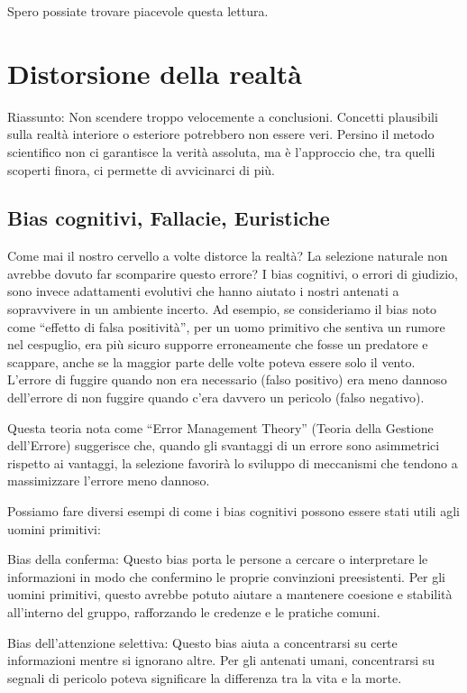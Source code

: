 \documentclass[12pt]{book} %
\begin{document}
Spero possiate trovare piacevole questa lettura.

\clearpage\section{Distorsione della realtà}
\begin{mdframed}[linewidth=1pt]
Riassunto: Non scendere troppo velocemente a conclusioni. Concetti plausibili sulla realtà interiore o esteriore potrebbero non essere veri. Persino il metodo scientifico non ci garantisce la verità assoluta, ma è l'approccio che, tra quelli scoperti finora, ci permette di avvicinarci di più.
\end{mdframed}

\subsection{Bias cognitivi, Fallacie, Euristiche}
Come mai il nostro cervello a volte distorce la realtà? La selezione naturale non avrebbe dovuto far scomparire questo errore?
I bias cognitivi, o errori di giudizio, sono invece adattamenti evolutivi che hanno aiutato i nostri antenati a sopravvivere in un ambiente incerto. Ad esempio, se consideriamo il bias noto come “effetto di falsa positività”, per un uomo primitivo che sentiva un rumore nel cespuglio, era più sicuro supporre erroneamente che fosse un predatore e scappare, anche se la maggior parte delle volte poteva essere solo il vento. L'errore di fuggire quando non era necessario (falso positivo) era meno dannoso dell'errore di non fuggire quando c'era davvero un pericolo (falso negativo).

Questa teoria nota come “Error Management Theory” (Teoria della Gestione dell'Errore) suggerisce che, quando gli svantaggi di un errore sono asimmetrici rispetto ai vantaggi, la selezione favorirà lo sviluppo di meccanismi che tendono a massimizzare l'errore meno dannoso.

Possiamo fare diversi esempi di come i bias cognitivi possono essere stati utili agli uomini primitivi:

Bias della conferma: Questo bias porta le persone a cercare o interpretare le informazioni in modo che confermino le proprie convinzioni preesistenti. Per gli uomini primitivi, questo avrebbe potuto aiutare a mantenere coesione e stabilità all'interno del gruppo, rafforzando le credenze e le pratiche comuni.

Bias dell'attenzione selettiva: Questo bias aiuta a concentrarsi su certe informazioni mentre si ignorano altre. Per gli antenati umani, concentrarsi su segnali di pericolo poteva significare la differenza tra la vita e la morte.
\end{document}
